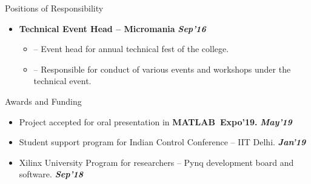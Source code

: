 \documentclass[11pt]{resume}
\newcommand{\mt}{\textsc{MATLAB}}
\newenvironment{outerlist}[1][\enskip\textbullet]%
{\begin{itemize}[#1,leftmargin=*]}{\end{itemize}%
	\vspace{-.5\baselineskip}}
\newenvironment{innerlist}[1][\enskip\textbullet]%
{\begin{itemize}[#1,leftmargin=*,parsep=0pt,itemsep=0pt,topsep=0pt,partopsep=0pt]}
	{\end{itemize}}
\begin{document}
\begin{rSection}{Positions of Responsibility}
\begin{outerlist}
\begin{innerlist}
				\item[--] Organizing various training and placements programs for a class of 60 students.
			\end{innerlist}	
		\item \textbf{Technical Event Head -- Micromania } \hfill \textit{\textbf{Sep'16}}
			\begin{innerlist}
				\item[--] Event head for annual technical fest of the college.
				\item[--] Responsible for conduct of various events and workshops under the technical event.
		\end{innerlist}		
	\end{outerlist}
\end{rSection}
\vspace{14mm}
\begin{rSection}{Awards and Funding}
\begin{outerlist}
	\item Project accepted for oral presentation in \textbf{\mt ~Expo'19.} \hfill \textit{\textbf{May'19}}
	\item Student support program for Indian Control Conference -- IIT Delhi. \hfill \textit{\textbf{Jan'19}}
	\item Xilinx University Program for researchers  -- Pynq development board and software. \hfill \textit{\textbf{Sep'18}}
\end{outerlist}
\end{rSection}
\vspace{20mm}
\end{document}
